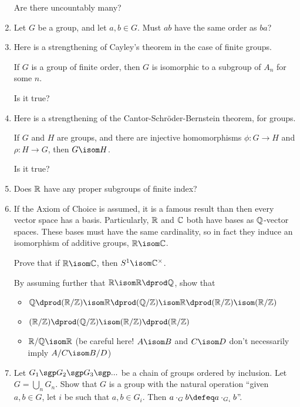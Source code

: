 \documentclass[a4paper,12pt]{article}
\begin{document}
\begin{enumerate}[leftmargin=*]
  Are there uncountably many?
 \item
  Let \(G\) be a group, and let \(a, b \in G\). Must \(ab\) have the same order
  as \(ba\)?
 \item
  Here is a strengthening of Cayley's theorem in the case of finite groups.
  \begin{tcolorbox}
   If \(G\) is a group of finite order, then \(G\) is isomorphic to a subgroup
   of \(A_n\) for some \(n\).
  \end{tcolorbox}
  Is it true?
 \item
  Here is a strengthening of the Cantor-Schr\"oder-Bernstein theorem, for
  groups.
  \begin{tcolorbox}
   If \(G\) and \(H\) are groups, and there are injective homomorphisms
   \(\phi: G \to H\) and \(\rho: H \to G\), then \(G \isom H\).
  \end{tcolorbox}
  Is it true?
 \item
  Does \(\mathbb R\) have any proper subgroups of finite index?
 \item
  If the Axiom of Choice is assumed, it is a famous result than then every
  vector space has a basis. Particularly, \(\mathbb R\) and \(\mathbb C\) both have bases as
  \(\mathbb Q\)-vector spaces. These bases must have the same cardinality, so in fact
  they induce an isomorphism of additive groups, \(\R \isom \C\).

  Prove that if \(\R \isom \C\), then \(S^1 \isom \C^\times\).

  By assuming further that \(\R \isom \R \dprod \Q\), show that
  \begin{itemize}
   \item
    \(\Q \dprod (\R/\Z) \isom \R \dprod (\Q/\Z) \isom
      \R \dprod (\R/\Z) \isom (\R/\Z)\)
   \item
    \((\R/\Z) \dprod (\Q/\Z) \isom (\R/\Z) \dprod (\R/\Z)\)
   \item
    \(\R/\Q \isom \R\)
    (be careful here! \(A \isom B\) and \(C \isom D\) don't necessarily imply
    \(A/C \isom B/D\))
  \end{itemize}
 \item
  Let \(G_1 \sgp G_2 \sgp G_3 \sgp ...\) be a chain of groups ordered by
  inclusion. Let \(G = \bigcup_n G_n\). Show that \(G\) is a group with the
  natural operation ``given \(a, b \in G\), let \(i\) be such that
  \(a, b \in G_i\). Then \(a \cdot_G b \defeq a \cdot_{G_i} b\)''.


\end{enumerate}
\end{document}
